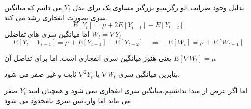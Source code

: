 \documentclass[a5paper,10pt]{article}
\begin{document}
بدلیل وجود ضرایب اتو رگرسیو بزرگتر مساوی یک برای مدل $Y_t$ می دانیم که میانگین سری بصورت انفجاری رشد می کند.
\[ E[Y_t] = \mu + 2E[Y_{t-1}] -E[Y_{t-2}]   \]
 اما میانگین سری های تفاضلی $W_t = \nabla Y_t$
\[ E[Y_t - Y_{t-1}] = \mu + E[Y_{t-1}] - E[Y_{t-2}] \quad\Rightarrow\quad E[W_t] = \mu + E[W_{t-1}] \]

یعنی هنوز میانگین سری انفجاری است. اما برای تفاصل آن
$ E[\nabla W_t] = \mu $

بنابرین میانگین سری $\nabla W_t$ یا $\nabla^2 Y_t$
ثابت و غیر صفر می شود.  

اما اگر عرض از مبدا نداشتیم،‌میانگین سری انفجاری نمی شود و همچنان امید $Y_t$ صفر می ماند اما واریانس سری نامحدود می شود.
\end{document}
